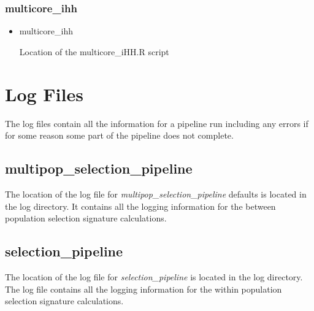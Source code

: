 \documentclass[a4paper,10pt]{article}
\begin{document}
\subsubsection{multicore\_ihh}
\begin{itemize}
\item multicore\_ihh

Location of the multicore\_iHH.R script



\end{itemize}
\section{Log Files}
The log files contain all the information for a pipeline run including any errors if for some reason some part of the pipeline does not complete.
\subsection{multipop\_selection\_pipeline}
The location of the log file for  \emph{multipop\_selection\_pipeline} defaults is
located in the log directory. It contains all the logging information
for the between population selection signature calculations.

\subsection{selection\_pipeline}
The location of the log file for \emph{selection\_pipeline} is located
in the log directory. The log file contains all the logging
information for the within population selection signature
calculations.
\end{document}
